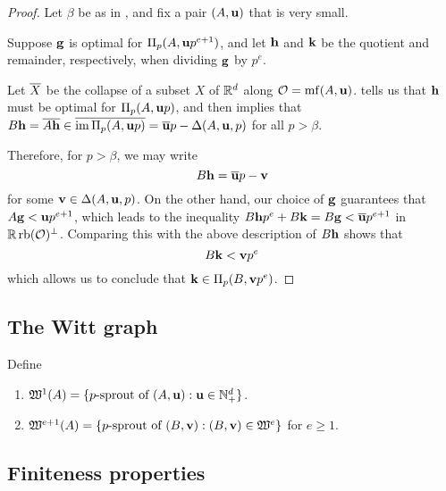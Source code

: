 \documentclass[11pt]{amsart}
\begin{document}
\begin{proof}  Let $\beta$ be as in , and fix a pair $(A, \mathbf{u})$ that is very small.


Suppose $\mathbf{g}$ is optimal for $\Pi_p(A, \mathbf{u}p^{e+1})$, and let $\mathbf{h}$ and $\mathbf{k}$ be the quotient and remainder, respectively, when dividing $\mathbf{g}$ by $p^e$.

Let $\overline{X}$ be the collapse of a subset $X$ of $\mathbb{R}^d$ along $\mathcal{O} = \operatorname{mf}(A, \mathbf{u})$.   tells us that $\mathbf{h}$ must be optimal for $\Pi_p(A, \mathbf{u}p)$, and  then implies that $B \mathbf{h} = \overline{A \mathbf{h}} \in \overline{\operatorname{im} \Pi_p(A, \mathbf{u}p)} = \overline{\mathbf{u}}p - \Delta(A, \mathbf{u}, p)$ for all $p > \beta$.   

Therefore, for $p > \beta$, we may write \[ B \mathbf{h} = \overline{\mathbf{u}}p - \mathbf{v}\] for some $\mathbf{v} \in \Delta(A, \mathbf{u}, p)$.  On the other hand, our choice of $\mathbf{g}$ guarantees that $A \mathbf{g} < \mathbf{u}p^{e+1}$, which leads to the inequality $B \mathbf{h} p^e + B \mathbf{k} = B \mathbf{g} <  \overline{\mathbf{u}}p^{e+1}$  in $\mathbb{R} \operatorname{rb}(\mathcal{O})^{\perp}$.  Comparing this with the above description of $B \mathbf{h}$ shows that \[ B \mathbf{k} < \mathbf{v} p^e \] which allows us to conclude that $\mathbf{k} \in \Pi_p(B, \mathbf{v} p^e)$.  %
\end{proof}


\subsection{The Witt graph}


\begin{definition}
 Define
\begin{enumerate}
\item $\mathfrak{W}^1(A) = \{ p\text{-sprout of } (A, \mathbf{u}) : \mathbf{u} \in \mathbb{N}_+^d \}$.
\item $\mathfrak{W}^{e+1}(A) = \{ p\text{-sprout of } (B, \mathbf{v}) : (B, \mathbf{v}) \in \mathfrak{W}^e  \}$ for $e \geq 1$. 
\end{enumerate}
\end{definition}




\subsection*{Finiteness properties}
\end{document}

